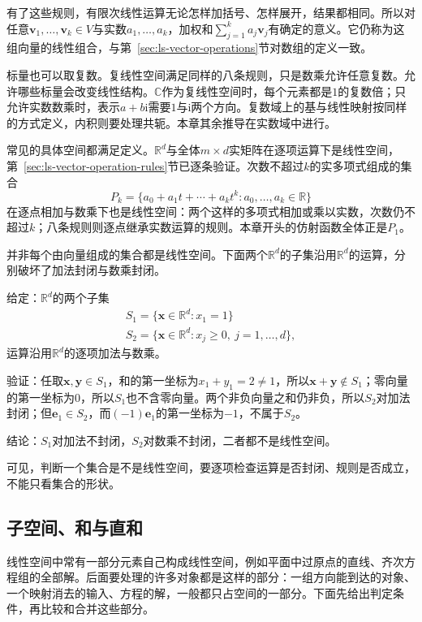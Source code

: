 有了这些规则，有限次线性运算无论怎样加括号、怎样展开，结果都相同。所以对任意$\bm v_1,\ldots,\bm v_k\in V$与实数$a_1,\ldots,a_k$，加权和$\sum_{j=1}^ka_j\bm v_j$有确定的意义。它仍称为这组向量的线性组合，与第~\ref{sec:ls-vector-operations}节对数组的定义一致。

标量也可以取复数。复线性空间满足同样的八条规则，只是数乘允许任意复数。允许哪些标量会改变线性结构。$\mathbb C$作为复线性空间时，每个元素都是$1$的复数倍；只允许实数数乘时，表示$a+b\mathrm i$需要$1$与$\mathrm i$两个方向。复数域上的基与线性映射按同样的方式定义，内积则要处理共轭。本章其余推导在实数域中进行。

常见的具体空间都满足定义。$\mathbb R^d$与全体$m\times d$实矩阵在逐项运算下是线性空间，第~\ref{sec:ls-vector-operation-rules}节已逐条验证。次数不超过$k$的实多项式组成的集合
\[
 P_k=\{a_0+a_1t+\cdots+a_kt^k:a_0,\ldots,a_k\in\mathbb R\}
\]
在逐点相加与数乘下也是线性空间：两个这样的多项式相加或乘以实数，次数仍不超过$k$；八条规则则逐点继承实数运算的规则。本章开头的仿射函数全体正是$P_1$。

并非每个由向量组成的集合都是线性空间。下面两个$\mathbb R^d$的子集沿用$\mathbb R^d$的运算，分别破坏了加法封闭与数乘封闭。
\begin{example}[反例：仿射约束集与非负向量集]
\label{ex:ls-non-vector-space-sets}
给定：$\mathbb R^d$的两个子集
\[
 \begin{gathered}
S_1=\{\bm x\in\mathbb R^d:x_1=1\}\\
S_2=\{\bm x\in\mathbb R^d:x_j\geq0,\ j=1,\ldots,d\},
 \end{gathered}
\]
运算沿用$\mathbb R^d$的逐项加法与数乘。

验证：任取$\bm x,\bm y\in S_1$，和的第一坐标为$x_1+y_1=2\neq1$，所以$\bm x+\bm y\notin S_1$；零向量的第一坐标为$0$，所以$S_1$也不含零向量。两个非负向量之和仍非负，所以$S_2$对加法封闭；但$\bm e_1\in S_2$，而$(-1)\bm e_1$的第一坐标为$-1$，不属于$S_2$。

结论：$S_1$对加法不封闭，$S_2$对数乘不封闭，二者都不是线性空间。
\end{example}
可见，判断一个集合是不是线性空间，要逐项检查运算是否封闭、规则是否成立，不能只看集合的形状。

\subsection{子空间、和与直和}
\label{sec:ls-subspaces}
\label{sec:linear-algebra-relations}
\label{sec:linear-algebra-subspace-relations}
\label{sec:ls-subspace-definition}

线性空间中常有一部分元素自己构成线性空间，例如平面中过原点的直线、齐次方程组的全部解。后面要处理的许多对象都是这样的部分：一组方向能到达的对象、一个映射消去的输入、方程的解，一般都只占空间的一部分。下面先给出判定条件，再比较和合并这些部分。

